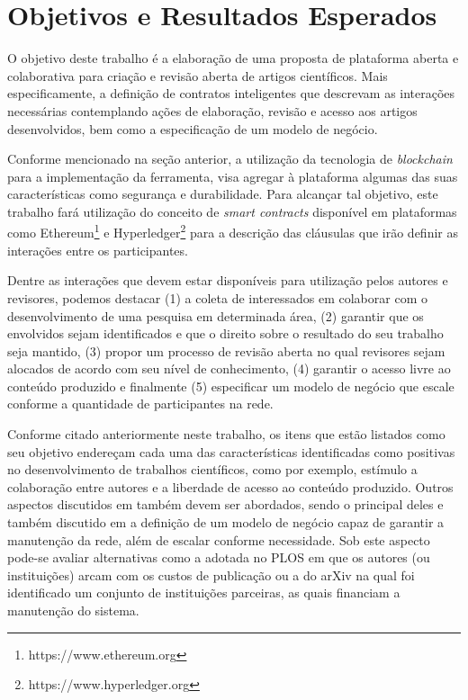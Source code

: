 \chapter{Objetivos e Resultados Esperados}
O objetivo deste trabalho é a elaboração de uma proposta de plataforma aberta e colaborativa para criação e revisão aberta de artigos científicos. Mais especificamente, a definição de contratos inteligentes que descrevam as interações necessárias contemplando ações de elaboração, revisão e acesso aos artigos desenvolvidos, bem como a especificação de um modelo de negócio.

Conforme mencionado na seção anterior, a utilização da tecnologia de \textit{blockchain} para a implementação da ferramenta, visa agregar à plataforma algumas das suas características como segurança e durabilidade. Para alcançar tal objetivo, este trabalho fará utilização do conceito de \textit{smart contracts} disponível em plataformas como Ethereum\footnote{https://www.ethereum.org} e Hyperledger\footnote{https://www.hyperledger.org} para a descrição das cláusulas que irão definir as interações entre os participantes.

Dentre as interações que devem estar disponíveis para utilização pelos autores e revisores, podemos destacar (1) a coleta de interessados em colaborar com o desenvolvimento de uma pesquisa em determinada área, (2) garantir que os envolvidos sejam identificados e que o direito sobre o resultado do seu trabalho seja mantido, (3) propor um processo de revisão aberta no qual revisores sejam alocados de acordo com seu nível de conhecimento, (4) garantir o acesso livre ao conteúdo produzido e finalmente (5) especificar um modelo de negócio que escale conforme a quantidade de participantes na rede.

Conforme citado anteriormente neste trabalho, os itens que estão listados como seu objetivo endereçam cada uma das características identificadas como positivas no desenvolvimento de trabalhos científicos, como por exemplo, estímulo a colaboração entre autores e a liberdade de acesso ao conteúdo produzido. Outros aspectos discutidos em \cite{OpenAccessAnalysis2004} também devem ser abordados, sendo o principal deles e também discutido em \cite{InteractivePeerReview2010} a definição de um modelo de negócio capaz de garantir a manutenção da rede, além de escalar conforme necessidade. Sob este aspecto pode-se avaliar alternativas como a adotada no PLOS em que os autores (ou instituições) arcam com os custos de publicação ou a do arXiv na qual foi identificado um conjunto de instituições parceiras, as quais financiam a manutenção do sistema.

